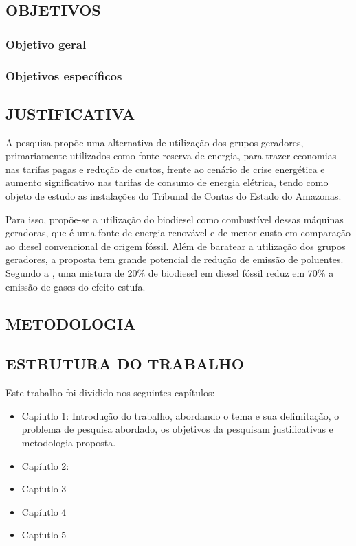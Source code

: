 \subsection{OBJETIVOS}
\subsubsection{Objetivo geral}
\subsubsection{Objetivos específicos}

\subsection{JUSTIFICATIVA}

A pesquisa propõe uma alternativa de utilização dos grupos geradores, primariamente utilizados como fonte reserva de energia, para trazer economias nas tarifas pagas e redução de custos, frente ao cenário de crise energética e aumento significativo nas tarifas de consumo de energia elétrica, tendo como objeto de estudo as instalações do Tribunal de Contas do Estado do Amazonas.

Para isso, propõe-se a utilização do biodiesel como combustível dessas máquinas geradoras, que é uma fonte de energia renovável e de menor custo em comparação ao diesel convencional de origem fóssil. Além de baratear a utilização dos grupos geradores, a proposta tem grande potencial de redução de emissão de poluentes. Segundo a , uma mistura de 20\% de biodiesel em diesel fóssil reduz em 70\% a emissão de gases do efeito estufa.


\subsection{METODOLOGIA}

\subsection{ESTRUTURA DO TRABALHO}

Este trabalho foi dividido nos seguintes capítulos:

\begin{itemize}
    \item    Capíutlo 1: Introdução do trabalho, abordando o tema e sua delimitação, o problema de pesquisa abordado, os objetivos da pesquisam justificativas e metodologia proposta.
    \item Capíutlo 2: 
    \item Capíutlo 3
    \item Capíutlo 4
    \item Capíutlo 5
\end{itemize}

   
    
    
